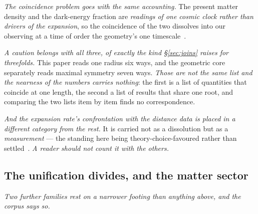 \documentclass[11pt,a4paper]{article}
\theoremstyle{plain}
\theoremstyle{definition}
\begin{document}
\emph{The coincidence problem goes with the same accounting.} The present matter density and the dark-energy
fraction are \emph{readings of one cosmic clock rather than drivers of the expansion}, so the coincidence of
the two dissolves into our observing at a time of order the geometry's one
timescale~\cite{JanzenCRcosmology}.

\emph{A caution belongs with all three, of exactly the kind \S\ref{sec:joins} raises for threefolds.} This
paper reads one radius six ways, and the geometric core separately reads maximal symmetry seven
ways. \emph{Those are not the same list and the nearness of the numbers carries nothing}: the first is a list
of quantities that coincide at one length, the second a list of results that share one root, and comparing
the two lists item by item finds no correspondence.

\emph{And the expansion rate's confrontation with the distance data is placed in a different category from the rest.} It is carried not as a dissolution but as a \emph{measurement} --- the standing here being
theory-choice-favoured rather than settled~\cite{JanzenCRcosmology}. \emph{A reader should not count it with
the others.}

\subsection{The unification divides, and the matter sector}

\emph{Two further families rest on a narrower footing than anything above, and the corpus says so.}
\end{document}
